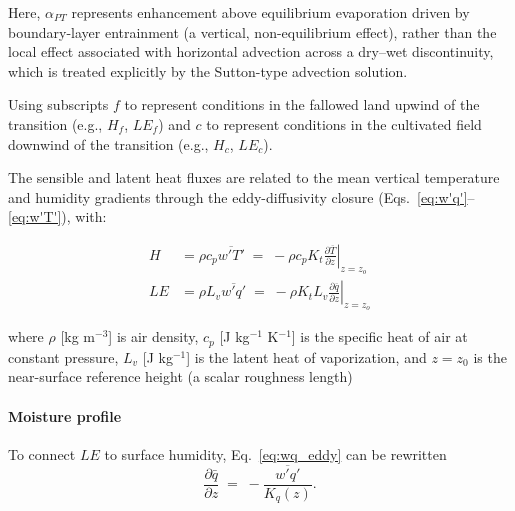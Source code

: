 \documentclass{article}
\begin{document}
    Here, $\alpha_{PT}$ represents enhancement above equilibrium evaporation driven by boundary-layer entrainment (a vertical, non-equilibrium effect), rather than the local effect associated with horizontal advection across a dry--wet discontinuity, which is treated explicitly by the Sutton-type advection solution. 


    

    Using  subscripts $f$  to represent conditions in the fallowed land upwind of the transition (e.g., $H_f$, $LE_f$)  and $c$ to represent conditions in the cultivated field downwind of the transition (e.g., $H_c$, $LE_c$).

    The sensible and latent heat fluxes are related to the mean vertical temperature and humidity gradients through the eddy-diffusivity closure (Eqs.~\ref{eq:w'q'}--\ref{eq:w'T'}), with: 

    \begin{align}
    \label{eq:H_kinematic}
    H  &= \rho c_p\overline{w'T'} \;=\; -\rho c_p K_t\left.\frac{\partial \overline{T}}{\partial z}\right|_{z=z_o}\\
    \label{eq:LE_kinematic}
    LE &= \rho L_v \overline{w'q'} \;=\; -\rho K_t L_v\left.\frac{\partial \overline{q}}{\partial z}\right|_{z=z_o}
    \end{align}

    \noindent where
     $\rho$ [kg m$^{-3}$] is air density,  $c_p$ [J kg$^{-1}$ K$^{-1}$] is the specific heat of air at constant pressure,
     $L_v$ [J kg$^{-1}$] is the latent heat of vaporization, and $z=z_0$ is the  near-surface reference height  (a scalar roughness length)


    \paragraph{Moisture profile}

    To connect $LE$ to surface humidity, 
    Eq.~\eqref{eq:wq_eddy} can be rewritten
    \begin{equation}
    \frac{\partial \bar q}{\partial z}
    \;=\;
    -\frac{\overline{w'q'}}{K_q(z)}.
    \end{equation}
\end{document}

